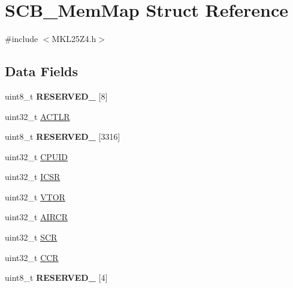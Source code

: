 \hypertarget{struct_s_c_b___mem_map}{}\section{S\+C\+B\+\_\+\+Mem\+Map Struct Reference}
\label{struct_s_c_b___mem_map}


{\ttfamily \#include $<$M\+K\+L25\+Z4.\+h$>$}

\subsection*{Data Fields}
\begin{DoxyCompactItemize}
\item 
\hypertarget{struct_s_c_b___mem_map_ab5b3e978eb3ceb8a2aadaeeab28db00b}{}uint8\+\_\+t {\bfseries R\+E\+S\+E\+R\+V\+E\+D\+\_} \mbox{[}8\mbox{]}\label{struct_s_c_b___mem_map_ab5b3e978eb3ceb8a2aadaeeab28db00b}

\item 
uint32\+\_\+t \hyperlink{struct_s_c_b___mem_map_afffeb2c080fb652c45dcccbc9432945c}{A\+C\+T\+L\+R}
\item 
\hypertarget{struct_s_c_b___mem_map_ab9f88fe5f82d75e61ca9e017c80bcca7}{}uint8\+\_\+t {\bfseries R\+E\+S\+E\+R\+V\+E\+D\+\_} \mbox{[}3316\mbox{]}\label{struct_s_c_b___mem_map_ab9f88fe5f82d75e61ca9e017c80bcca7}

\item 
uint32\+\_\+t \hyperlink{struct_s_c_b___mem_map_a1e5baee14946bb64bd1e68e481f6d6b0}{C\+P\+U\+I\+D}
\item 
uint32\+\_\+t \hyperlink{struct_s_c_b___mem_map_a66ceabdaf0762f2f5935c87b80e0b246}{I\+C\+S\+R}
\item 
uint32\+\_\+t \hyperlink{struct_s_c_b___mem_map_a3799e3af2b9f5d2f0740354953ba509d}{V\+T\+O\+R}
\item 
uint32\+\_\+t \hyperlink{struct_s_c_b___mem_map_ad69a7e2aba70bd9fa6924533a23a062a}{A\+I\+R\+C\+R}
\item 
uint32\+\_\+t \hyperlink{struct_s_c_b___mem_map_ae6694fb5a69483450401814d4d2aadae}{S\+C\+R}
\item 
uint32\+\_\+t \hyperlink{struct_s_c_b___mem_map_a9f5754479885a80651e6ce99ce44fbeb}{C\+C\+R}
\item 
\hypertarget{struct_s_c_b___mem_map_acc19a07675d1806592b3ed4a92f91e1c}{}uint8\+\_\+t {\bfseries R\+E\+S\+E\+R\+V\+E\+D\+\_} \mbox{[}4\mbox{]}\label{struct_s_c_b___mem_map_acc19a07675d1806592b3ed4a92f91e1c}


\end{DoxyCompactItemize}

